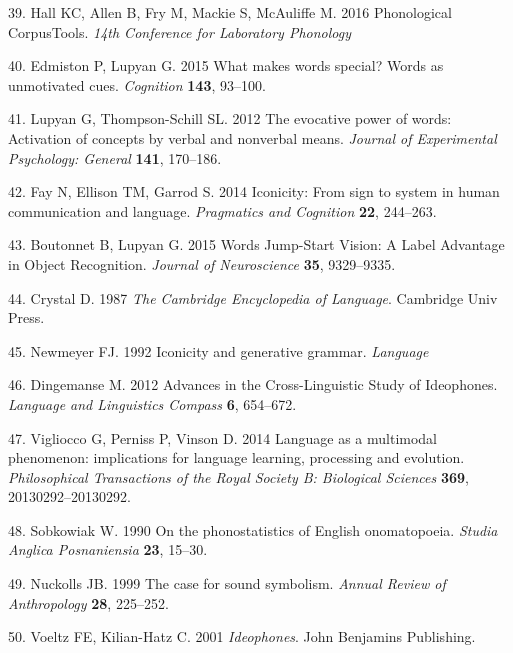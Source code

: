 \documentclass[english,floatsintext,man]{apa6}
\theoremstyle{definition}
\theoremstyle{definition}
\theoremstyle{definition}
\theoremstyle{remark}
\begin{document}
\leavevmode\hypertarget{ref-PCT:1.1}{}%
39. Hall KC, Allen B, Fry M, Mackie S, McAuliffe M. 2016 Phonological
CorpusTools. \emph{14th Conference for Laboratory Phonology}

\leavevmode\hypertarget{ref-Edmiston:2015he}{}%
40. Edmiston P, Lupyan G. 2015 What makes words special? Words as
unmotivated cues. \emph{Cognition} \textbf{143}, 93--100.

\leavevmode\hypertarget{ref-Lupyan:2012cp}{}%
41. Lupyan G, Thompson-Schill SL. 2012 The evocative power of words:
Activation of concepts by verbal and nonverbal means. \emph{Journal of
Experimental Psychology: General} \textbf{141}, 170--186.

\leavevmode\hypertarget{ref-Fay:2014ih}{}%
42. Fay N, Ellison TM, Garrod S. 2014 Iconicity: From sign to system in
human communication and language. \emph{Pragmatics and Cognition}
\textbf{22}, 244--263.

\leavevmode\hypertarget{ref-Boutonnet:2015fz}{}%
43. Boutonnet B, Lupyan G. 2015 Words Jump-Start Vision: A Label
Advantage in Object Recognition. \emph{Journal of Neuroscience}
\textbf{35}, 9329--9335.

\leavevmode\hypertarget{ref-Crystal:1987en}{}%
44. Crystal D. 1987 \emph{The Cambridge Encyclopedia of Language}.
Cambridge Univ Press.

\leavevmode\hypertarget{ref-Newmeyer:1992we}{}%
45. Newmeyer FJ. 1992 Iconicity and generative grammar. \emph{Language}

\leavevmode\hypertarget{ref-Dingemanse:2012fc}{}%
46. Dingemanse M. 2012 Advances in the Cross-Linguistic Study of
Ideophones. \emph{Language and Linguistics Compass} \textbf{6},
654--672.

\leavevmode\hypertarget{ref-Vigliocco:2014fc}{}%
47. Vigliocco G, Perniss P, Vinson D. 2014 Language as a multimodal
phenomenon: implications for language learning, processing and
evolution. \emph{Philosophical Transactions of the Royal Society B:
Biological Sciences} \textbf{369}, 20130292--20130292.

\leavevmode\hypertarget{ref-Sobkowiak:1990ph}{}%
48. Sobkowiak W. 1990 On the phonostatistics of English onomatopoeia.
\emph{Studia Anglica Posnaniensia} \textbf{23}, 15--30.

\leavevmode\hypertarget{ref-Nuckolls:1999ca}{}%
49. Nuckolls JB. 1999 The case for sound symbolism. \emph{Annual Review
of Anthropology} \textbf{28}, 225--252.

\leavevmode\hypertarget{ref-Voeltz:2001vv}{}%
50. Voeltz FE, Kilian-Hatz C. 2001 \emph{Ideophones}. John Benjamins
Publishing.
\end{document}
